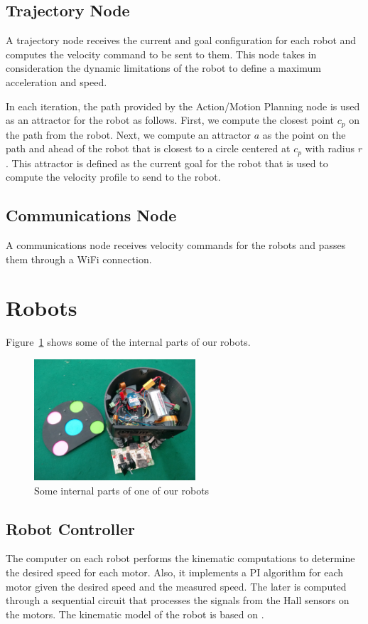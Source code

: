 \documentclass[]{llncs}
\newcommand{\TODO}[1]{{\textcolor{blue}{ToDo: {#1}}}}
\begin{document}
 
\subsection{Trajectory Node}
A trajectory node receives the current and goal configuration for each robot and computes the velocity command to be sent to them. This node takes in consideration the dynamic limitations of the robot to define a maximum acceleration and speed. 

In each iteration, the path provided by the Action/Motion Planning node is used as an attractor for the robot as follows. First, we compute the closest point $c_p$ on the path from the robot. Next, we compute an attractor $a$ as the point on the path and ahead of the robot that is closest to a circle centered at $c_p$ with radius $r$. This attractor is defined as the current goal for the robot that is used to compute the velocity profile to send to the robot.


\subsection{Communications Node}
A communications node receives velocity commands for the robots and passes them through a WiFi connection.




\section{Robots}

Figure~\ref{fig:one_ekbot_inside} shows some of the internal parts of our robots.

\begin{figure}[htb]
	\centering
	\includegraphics[width=6cm]{./pictures/one_ekbot_inside.jpg}
	\caption{Some internal parts of one of our robots}
	\label{fig:one_ekbot_inside}  
\end{figure}


\subsection{Robot Controller}
The computer on each robot performs the kinematic computations to
determine the desired speed for each motor. Also, it implements a PI
algorithm for each motor given the desired speed and the measured
speed. The later is computed through a sequential circuit that processes
the signals from the Hall sensors on the motors. The kinematic model of the robot is based on \cite{rojas05}. 
\end{document}
